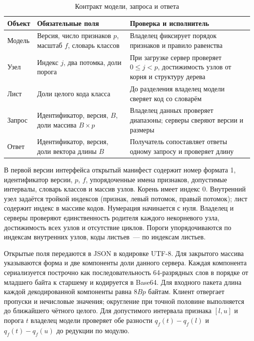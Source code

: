 \begin{table}[htbp]
\caption{Контракт модели, запроса и ответа}
\centering\small
\begin{tabularx}{\linewidth}{|p{.17\linewidth}|X|X|}
\hline
Объект & Обязательные поля & Проверка и исполнитель \\ \hline
Модель & Версия, число признаков $p$, масштаб $f$, словарь классов & Владелец фиксирует порядок признаков и правило равенства \\ \hline
Узел & Индекс $j$, два потомка, доли порога & При загрузке сервер проверяет $0\le j<p$, достижимость узлов от корня и структуру дерева \\ \hline
Лист & Доли целого кода класса & До разделения владелец модели сверяет код со словарём \\ \hline
Запрос & Идентификатор, версия, $B$, доли массива $B\times p$ & Владелец данных проверяет диапазоны; серверы сверяют версии и размеры \\ \hline
Ответ & Идентификатор, версия, доли вектора длины $B$ & Получатель сопоставляет ответы одному запросу и проверяет длину \\ \hline
\end{tabularx}
\end{table}

В первой версии интерфейса открытый манифест содержит номер формата 1, идентификатор версии, $p$, $f$, упорядоченные имена признаков, допустимые интервалы, словарь классов и массив узлов. Корень имеет индекс 0. Внутренний узел задаётся тройкой индексов (признак, левый потомок, правый потомок); лист содержит индекс в массиве кодов. Нумерация начинается с нуля. Владелец и серверы проверяют единственность родителя каждого некорневого узла, достижимость всех узлов и отсутствие циклов. Пороги упорядочиваются по индексам внутренних узлов, коды листьев~--- по индексам листьев.

Открытые поля передаются в JSON в кодировке UTF-8. Для закрытого массива указываются форма и две компоненты доли данного сервера. Каждая компонента сериализуется построчно как последовательность 64-разрядных слов в порядке от младшего байта к старшему и кодируется в Base64. Для входного пакета длина каждой декодированной компоненты равна $8Bp$ байтам. Клиент отвергает пропуски и нечисловые значения; округление при точной половине выполняется до ближайшего чётного целого. Для допустимого интервала признака $[l,u]$ и порога $t$ владелец модели проверяет обе разности $q_f(t)-q_f(l)$ и $q_f(t)-q_f(u)$ до редукции по модулю.

